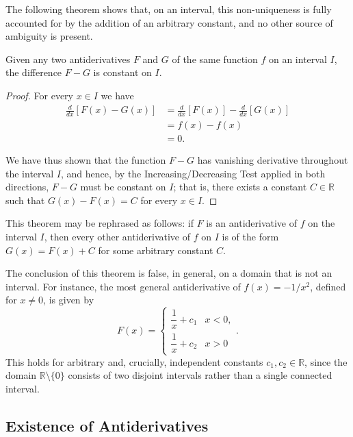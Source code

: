 The following theorem shows that, on an interval, this non-uniqueness is fully accounted for by the addition of an arbitrary constant, and no other source of ambiguity is present.

\begin{theorem}
Given any two antiderivatives $F$ and $G$ of the same function $f$ on an interval $I$, the difference $F - G$ is constant on $I$.
\end{theorem}

\begin{proof}
For every $x \in I$ we have
\[
\begin{aligned}
\frac{d}{dx} [F(x) - G(x)] &= \frac{d}{dx}[F(x)] - \frac{d}{dx}[G(x)] \\
&= f(x) - f(x) \\
&= 0.
\end{aligned}
\]

We have thus shown that the function $F - G$ has vanishing derivative throughout the interval $I$, and hence, by the Increasing/Decreasing Test applied in both directions, $F - G$ must be constant on $I$; that is, there exists a constant $C \in \mathbb{R}$ such that $G(x) - F(x) = C$ for every $x \in I$.
\end{proof}

This theorem may be rephrased as follows: if $F$ is an antiderivative of $f$ on the interval $I$, then every other antiderivative of $f$ on $I$ is of the form $G(x) = F(x) + C$ for some arbitrary constant $C$.

\begin{remark}
The conclusion of this theorem is false, in general, on a domain that is not an interval. For instance, the most general antiderivative of $f(x) = -1/x^2$, defined for $x \neq 0$, is given by
\[
F(x) =
\begin{cases}
\dfrac{1}{x} + c_1 & x < 0, \\[1mm]
\dfrac{1}{x} + c_2 & x > 0
\end{cases}.
\]
This holds for arbitrary and, crucially, independent constants $c_1, c_2 \in \mathbb{R}$, since the domain $\mathbb{R} \setminus \{0\}$ consists of two disjoint intervals rather than a single connected interval.
\end{remark}

\subsection{Existence of Antiderivatives}


